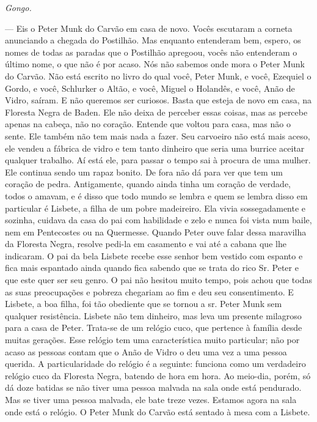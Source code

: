 \begin{myparindent}{0pt}
\begin{Parskip}
\emph{Gongo.}

 --- Eis o Peter Munk do Carvão em casa de novo. Vocês escutaram a
corneta anunciando a chegada do Postilhão. Mas enquanto entenderam bem,
espero, os nomes de todas as paradas que o Postilhão apregoou, vocês não
entenderam o último nome, o que não é por acaso. Nós não sabemos onde
mora o Peter Munk do Carvão. Não está escrito no livro do qual você,
Peter Munk, e você, Ezequiel o Gordo, e você, Schlurker o Altão, e você,
Miguel o Holandês, e você, Anão de Vidro, saíram. E não queremos ser
curiosos. Basta que esteja de novo em casa, na Floresta Negra de Baden.
Ele não deixa de perceber essas coisas, mas as percebe apenas na cabeça,
não no coração. Entende que voltou para casa, mas não o sente. Ele
também não tem mais nada a fazer. Seu carvoeiro não está mais aceso, ele
vendeu a fábrica de vidro e tem tanto dinheiro que seria uma burrice
aceitar qualquer trabalho. Aí está ele, para passar o tempo sai à
procura de uma mulher. Ele continua sendo um rapaz bonito. De fora não
dá para ver que tem um coração de pedra. Antigamente, quando ainda tinha
um coração de verdade, todos o amavam, e é disso que todo mundo se
lembra e quem se lembra disso em particular é Lisbete, a filha de um
pobre madeireiro. Ela vivia sossegadamente e sozinha, cuidava da casa do
pai com habilidade e zelo e nunca foi vista num baile, nem em
Pentecostes ou na Quermesse. Quando Peter ouve falar dessa maravilha da
Floresta Negra, resolve pedi-la em casamento e vai até a cabana que lhe
indicaram. O pai da bela Lisbete recebe esse senhor bem vestido com
espanto e fica mais espantado ainda quando fica sabendo que se trata do
rico Sr. Peter e que este quer ser seu genro. O pai não hesitou muito
tempo, pois achou que todas as suas preocupações e pobreza chegariam ao
fim e deu seu consentimento. E Lisbete, a boa filha, foi tão obediente
que se tornou a sr. Peter Munk sem qualquer resistência. Lisbete não
tem dinheiro, mas leva um presente milagroso para a casa de Peter.
Trata-se de um relógio cuco, que pertence à família desde muitas
gerações. Esse relógio tem uma característica muito particular; não por
acaso as pessoas contam que o Anão de Vidro o deu uma vez a uma pessoa
querida. A particularidade do relógio é a seguinte: funciona como um
verdadeiro relógio cuco da Floresta Negra, batendo de hora em hora. Ao
meio-dia, porém, só dá doze batidas se não tiver uma pessoa malvada na
sala onde está pendurado. Mas se tiver uma pessoa malvada, ele bate
treze vezes. Estamos agora na sala onde está o relógio. O Peter Munk do
Carvão está sentado à mesa com a Lisbete.


\end{Parskip}
\end{myparindent}
